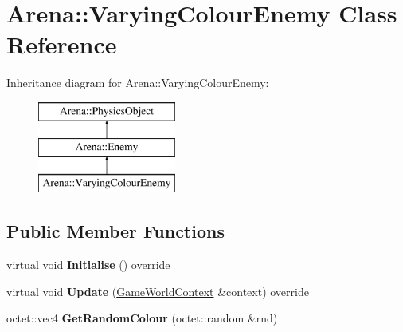 \hypertarget{class_arena_1_1_varying_colour_enemy}{\section{Arena\+:\+:Varying\+Colour\+Enemy Class Reference}
\label{class_arena_1_1_varying_colour_enemy}
}
Inheritance diagram for Arena\+:\+:Varying\+Colour\+Enemy\+:\begin{figure}[H]
\begin{center}
\leavevmode
\includegraphics[height=3.000000cm]{class_arena_1_1_varying_colour_enemy}
\end{center}
\end{figure}
\subsection*{Public Member Functions}
\begin{DoxyCompactItemize}
\item 
\hypertarget{class_arena_1_1_varying_colour_enemy_a45a91e1d5d404836fb721bca9bde0eef}{virtual void {\bfseries Initialise} () override}\label{class_arena_1_1_varying_colour_enemy_a45a91e1d5d404836fb721bca9bde0eef}

\item 
\hypertarget{class_arena_1_1_varying_colour_enemy_a6e224fa696f679a850f4fe9011b4fae8}{virtual void {\bfseries Update} (\hyperlink{struct_arena_1_1_game_world_context}{Game\+World\+Context} \&context) override}\label{class_arena_1_1_varying_colour_enemy_a6e224fa696f679a850f4fe9011b4fae8}

\item 
\hypertarget{class_arena_1_1_varying_colour_enemy_a4241cf5a296adce6ff652fb49a452b08}{octet\+::vec4 {\bfseries Get\+Random\+Colour} (octet\+::random \&rnd)}\label{class_arena_1_1_varying_colour_enemy_a4241cf5a296adce6ff652fb49a452b08}

\end{DoxyCompactItemize}

